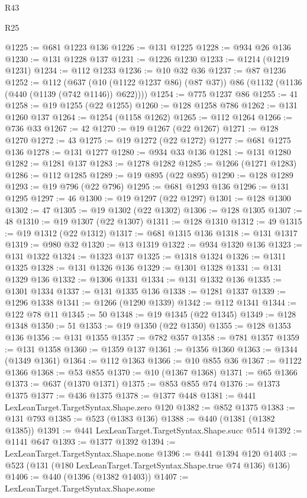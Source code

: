 \begin{lexlean}{R43}
\begin{lexlean}{R25}
\begin{coremodule}
{{{{{{{{{{{{{{{{{{{{{{{{{{{{{{{{{{{{{{{{{{{{{{{{{{{{{{{{{{{{{{{{{{{{{{{{{{{{{{{{{{{{{{{{{{{{{{{{{{{{{{{{{{{{{{{{{{{{{{{{{{{{{{{{{{{{{{{{{{{{{{{{{{{{{{{{{{{{{{{{{{{{{{{{{{{{{{{{{{{{{{{{{{{{{{{{{@1225 := @681 @1223 @136
@1226 := @131 @1225
@1228 := @934 @26 @136
@1230 := @131 @1228 @137
@1231 := @1226 @1230
@1233 := @1214 (@1219 @1231)
@1234 := @112 @1233
@1236 := @10 @32 @36
@1237 := @87 @1236
@1252 := @112
    (@637 (@10 (@1122 @1237 @86) (@87 @37)) @86 (@1132 (@1136 (@440 (@1139 (@742 @1146)) @622))))
@1254 := @775 @1237 @86
@1255 := 41
@1258 := @19 @1255 (@22 @1255)
@1260 := @128 @1258 @786
@1262 := @131 @1260 @137
@1264 := @1254 (@1158 @1262)
@1265 := @112 @1264
@1266 := @736 @33
@1267 := 42
@1270 := @19 @1267 (@22 @1267)
@1271 := @128 @1270
@1272 := 43
@1275 := @19 @1272 (@22 @1272)
@1277 := @681 @1275 @136
@1278 := @131 @1277
@1280 := @934 @33 @136
@1281 := @131 @1280
@1282 := @1281 @137
@1283 := @1278 @1282
@1285 := @1266 (@1271 @1283)
@1286 := @112 @1285
@1289 := @19 @895 (@22 @895)
@1290 := @128 @1289
@1293 := @19 @796 (@22 @796)
@1295 := @681 @1293 @136
@1296 := @131 @1295
@1297 := 46
@1300 := @19 @1297 (@22 @1297)
@1301 := @128 @1300
@1302 := 47
@1305 := @19 @1302 (@22 @1302)
@1306 := @128 @1305
@1307 := 48
@1310 := @19 @1307 (@22 @1307)
@1311 := @128 @1310
@1312 := 49
@1315 := @19 @1312 (@22 @1312)
@1317 := @681 @1315 @136
@1318 := @131 @1317
@1319 := @980 @32
@1320 := @13 @1319
@1322 := @934 @1320 @136
@1323 := @131 @1322
@1324 := @1323 @137
@1325 := @1318 @1324
@1326 := @1311 @1325
@1328 := @131 @1326 @136
@1329 := @1301 @1328
@1331 := @131 @1329 @136
@1332 := @1306 @1331
@1334 := @131 @1332 @136
@1335 := @1301 @1334
@1337 := @131 @1335 @136
@1338 := @1281 @1337
@1339 := @1296 @1338
@1341 := @1266 (@1290 @1339)
@1342 := @112 @1341
@1344 := @122 @78 @11
@1345 := 50
@1348 := @19 @1345 (@22 @1345)
@1349 := @128 @1348
@1350 := 51
@1353 := @19 @1350 (@22 @1350)
@1355 := @128 @1353 @136
@1356 := @131 @1355
@1357 := @782 @357
@1358 := @781 @1357
@1359 := @131 @1358
@1360 := @1359 @137
@1361 := @1356 @1360
@1363 := @1344 (@1349 @1361)
@1364 := @112 @1363
@1366 := @10 @855 @36
@1367 := @1122 @1366
@1368 := @53 @855
@1370 := @10 (@1367 @1368)
@1371 := @65 @1366
@1373 := @637 (@1370 @1371)
@1375 := @853 @855 @74
@1376 := @1373 @1375
@1377 := @436 @1375
@1378 := @1377 @448
@1381 := @441 LexLeanTarget.TargetSyntax.Shape.zero @120
@1382 := @852 @1375
@1383 := @131 @793
@1385 := @523 (@1383 @136)
@1388 := @440 (@1381 (@1382 @1385))
@1391 := @441 LexLeanTarget.TargetSyntax.Shape.succ @514
@1392 := @1141 @647
@1393 := @1377 @1392
@1394 := LexLeanTarget.TargetSyntax.Shape.none
@1396 := @441 @1394 @120
@1403 := @523 (@131 (@180 LexLeanTarget.TargetSyntax.Shape.true @74 @136) @136)
@1406 := @440 (@1396 (@1382 @1403))
@1407 := LexLeanTarget.TargetSyntax.Shape.some
}}}}}}}}}}}}}}}}}}}}}}}}}}}}}}}}}}}}}}}}}}}}}}}}}}}}}}}}}}}}}}}}}}}}}}}}}}}}}}}}}}}}}}}}}}}}}}}}}}}}}}}}}}}}}}}}}}}}}}}}}}}}}}}}}}}}}}}}}}}}}}}}}}}}}}}}}}}}}}}}}}}}}}}}}}}}}}}}}}}}}}}}}}}}}}}}}
\end{coremodule}
\end{lexlean}
\end{lexlean}
